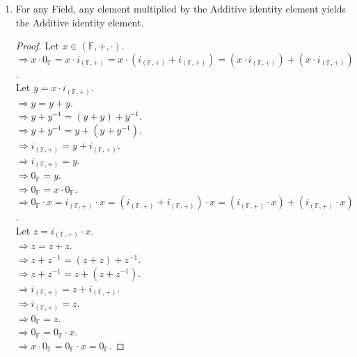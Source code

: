 \documentclass{article}
\begin{document}
\begin{enumerate}
				\item For any Field, any element multiplied by the Additive identity element yields the Additive identity element.
				\begin{proof}
					Let $x \in (\mathbb{F}, +, \cdot)$.\\
					$\Rightarrow x \cdot 0_{\mathbb{F}} = x \cdot i_{(\mathbb{F}, +)} = x \cdot (i_{(\mathbb{F}, +)} + i_{(\mathbb{F}, +)}) = (x \cdot i_{(\mathbb{F}, +)}) + (x \cdot i_{(\mathbb{F}, +)})$.\\
					Let $y = x \cdot i_{(\mathbb{F}, +)}$.\\
					$\Rightarrow y = y + y$.\\
					$\Rightarrow y + y^{-1} = (y + y) + y^{-1}$.\\
					$\Rightarrow y + y^{-1} = y + (y + y^{-1})$.\\
					$\Rightarrow i_{(\mathbb{F}, +)} = y + i_{(\mathbb{F}, +)}$.\\
					$\Rightarrow i_{(\mathbb{F}, +)} = y$.\\
					$\Rightarrow 0_{\mathbb{F}} = y$.\\
					$\Rightarrow 0_{\mathbb{F}} = x \cdot 0_{\mathbb{F}}$.
					$\Rightarrow 0_{\mathbb{F}} \cdot x = i_{(\mathbb{F}, +)} \cdot x = (i_{(\mathbb{F}, +)} + i_{(\mathbb{F}, +)}) \cdot x = (i_{(\mathbb{F}, +)} \cdot x) + (i_{(\mathbb{F}, +)} \cdot x)$.\\
					Let $z = i_{(\mathbb{F}, +)} \cdot x$.\\
					$\Rightarrow z = z + z$.\\
					$\Rightarrow z + z^{-1} = (z + z) + z^{-1}$.\\
					$\Rightarrow z + z^{-1} = z + (z + z^{-1})$.\\
					$\Rightarrow i_{(\mathbb{F}, +)} = z + i_{(\mathbb{F}, +)}$.\\
					$\Rightarrow i_{(\mathbb{F}, +)} = z$.\\
					$\Rightarrow 0_{\mathbb{F}} = z$.\\
					$\Rightarrow 0_{\mathbb{F}} = 0_{\mathbb{F}} \cdot x$.\\
					$\Rightarrow x \cdot 0_{\mathbb{F}} = 0_{\mathbb{F}} \cdot x = 0_{\mathbb{F}}$.
				\end{proof}
				

\end{enumerate}
\end{document}
